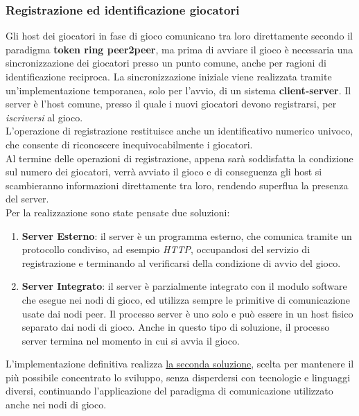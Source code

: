 \documentclass[10pt,a4paper]{article}
\begin{document}
\subsubsection{Registrazione ed identificazione giocatori}
Gli host dei giocatori in fase di gioco  comunicano tra loro direttamente secondo il paradigma \textbf{token ring peer2peer}, ma prima di avviare il gioco è necessaria una sincronizzazione dei giocatori presso un punto comune, anche per ragioni di identificazione reciproca. La sincronizzazione iniziale viene realizzata tramite un'implementazione temporanea, solo per l'avvio, di un sistema \textbf{client-server}. Il server è l'host comune, presso il quale i nuovi giocatori devono registrarsi, per \textit{iscriversi} al gioco.\\ L'operazione di registrazione restituisce anche un identificativo numerico univoco, che consente di riconoscere inequivocabilmente i giocatori. \\ Al termine delle operazioni di registrazione, appena sarà soddisfatta la condizione sul numero dei giocatori, verrà avviato il gioco e di conseguenza gli host si scambieranno informazioni direttamente tra loro, rendendo superflua la presenza del server.\\ Per la realizzazione sono state pensate due soluzioni:
\begin{enumerate}
\item \textbf{Server Esterno}: il server è un programma esterno, che comunica tramite un protocollo condiviso, ad esempio \textit{HTTP}, occupandosi del servizio di registrazione e terminando al verificarsi della condizione di avvio del gioco.

\item \textbf{Server Integrato}: il server è parzialmente integrato con il modulo software che esegue nei nodi di gioco, ed utilizza sempre le primitive di comunicazione usate dai nodi peer. Il processo server è uno solo e può essere in un host fisico separato dai nodi di gioco. Anche in questo tipo di soluzione, il processo server termina nel momento in cui si avvia il gioco. 
\end{enumerate}
L'implementazione definitiva realizza \underline{la seconda soluzione}, scelta per mantenere il più possibile concentrato lo sviluppo, senza disperdersi con tecnologie e linguaggi diversi, continuando  l'applicazione del paradigma di comunicazione utilizzato anche nei nodi di gioco.
\end{document}
